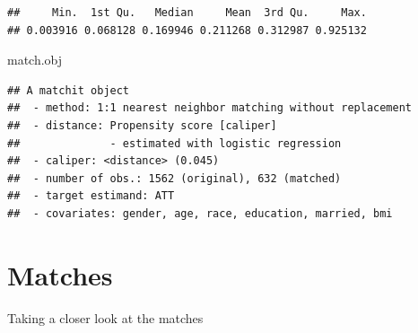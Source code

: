 \documentclass[
]{book}
\newenvironment{Shaded}{\begin{snugshade}}{\end{snugshade}}
\newcommand{\AttributeTok}[1]{\textcolor[rgb]{0.77,0.63,0.00}{#1}}
\newcommand{\ConstantTok}[1]{\textcolor[rgb]{0.00,0.00,0.00}{#1}}
\newcommand{\DecValTok}[1]{\textcolor[rgb]{0.00,0.00,0.81}{#1}}
\newcommand{\FunctionTok}[1]{\textcolor[rgb]{0.00,0.00,0.00}{#1}}
\newcommand{\NormalTok}[1]{#1}
\newcommand{\OtherTok}[1]{\textcolor[rgb]{0.56,0.35,0.01}{#1}}
\newcommand{\SpecialCharTok}[1]{\textcolor[rgb]{0.00,0.00,0.00}{#1}}
\newcommand{\StringTok}[1]{\textcolor[rgb]{0.31,0.60,0.02}{#1}}
\begin{document}
\begin{Shaded}
\end{Shaded}

\begin{verbatim}
##     Min.  1st Qu.   Median     Mean  3rd Qu.     Max. 
## 0.003916 0.068128 0.169946 0.211268 0.312987 0.925132
\end{verbatim}

\begin{Shaded}
\begin{Highlighting}[]
\NormalTok{match.obj}
\end{Highlighting}
\end{Shaded}

\begin{verbatim}
## A matchit object
##  - method: 1:1 nearest neighbor matching without replacement
##  - distance: Propensity score [caliper]
##              - estimated with logistic regression
##  - caliper: <distance> (0.045)
##  - number of obs.: 1562 (original), 632 (matched)
##  - target estimand: ATT
##  - covariates: gender, age, race, education, married, bmi
\end{verbatim}

\hypertarget{matches}{%
\section{Matches}\label{matches}}

Taking a closer look at the matches
\end{document}
